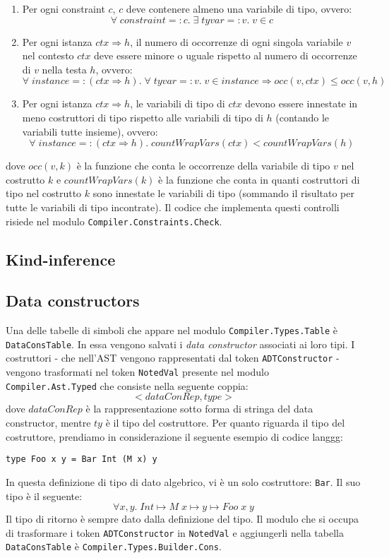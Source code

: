 \documentclass[10pt,a4paper]{article}
\begin{document}
\begin{enumerate}
    \item Per ogni constraint $ c $, $ c $ deve contenere almeno una variabile di tipo, ovvero:
    \[ \forall \; constraint =: c.\; \exists \; tyvar =: v.\; v \in c \]
    \item Per ogni istanza $ ctx \Rightarrow h $, il numero di occorrenze di ogni singola variabile $ v $ nel contesto
    $ ctx $ deve essere minore o uguale rispetto al numero di occorrenze di $ v $ nella testa $ h $, ovvero:
    \[ \forall \; instance =: (ctx \Rightarrow h).\; \forall \; tyvar =: v.\; v \in instance
    \Longrightarrow occ(v, ctx) \leq occ(v, h) \]
    \item Per ogni istanza $ ctx \Rightarrow h $, le variabili di tipo di $ ctx $ devono essere innestate in meno
    costruttori di tipo rispetto alle variabili di tipo di $ h $ (contando le variabili tutte insieme), ovvero: \newline
    \[ \forall \; instance =: (ctx \Rightarrow h).\; countWrapVars(ctx) < countWrapVars(h) \]
\end{enumerate}
dove $ occ(v, k) $ è la funzione che conta le occorrenze della variabile di tipo $ v $ nel costrutto $ k $ e
$ countWrapVars(k) $ è la funzione che conta in quanti costruttori di tipo nel costrutto $ k $ sono innestate le
variabili di tipo (sommando il risultato per tutte le variabili di tipo incontrate). Il codice che implementa questi
controlli risiede nel modulo \texttt{Compiler.Constraints.Check}.

\subsection{Kind-inference}

\subsection{Data constructors}
Una delle tabelle di simboli che appare nel modulo \texttt{Compiler.Types.Table} è \texttt{DataConsTable}. In essa
vengono salvati i \textit{data constructor} associati ai loro tipi. I costruttori - che nell'AST vengono rappresentati
dal token \texttt{ADTConstructor} - vengono trasformati nel token \texttt{NotedVal} presente nel modulo
\texttt{Compiler.Ast.Typed} che consiste nella seguente coppia:
\[ < dataConRep, type > \]
dove $ dataConRep $ è la rappresentazione sotto forma di stringa del data constructor, mentre $ ty $ è il tipo del
costruttore. Per quanto riguarda il tipo del costruttore, prendiamo in considerazione il seguente esempio di codice
langgg:
\begin{lstlisting}
type Foo x y = Bar Int (M x) y
\end{lstlisting}
In questa definizione di tipo di dato algebrico, vi è un solo costruttore: \texttt{Bar}. Il suo tipo è il seguente:
\[ \forall x, y. \; Int \mapsto M \; x \mapsto y \mapsto Foo \; x \; y \]
Il tipo di ritorno è sempre dato dalla definizione del tipo. Il modulo che si occupa di trasformare i token
\texttt{ADTConstructor} in \texttt{NotedVal} e aggiungerli nella tabella \texttt{DataConsTable} è
\texttt{Compiler.Types.Builder.Cons}.
\end{document}
